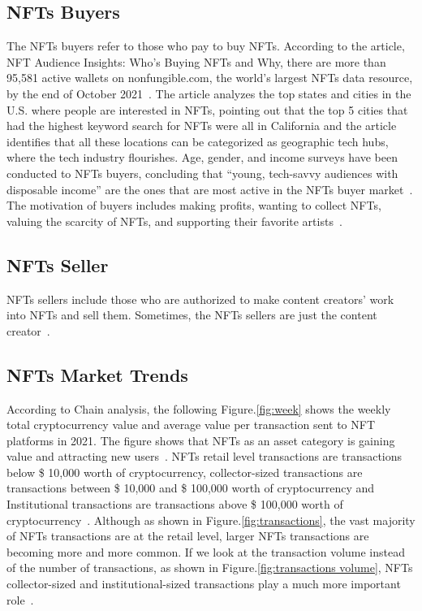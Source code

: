 \subsection{NFTs Buyers}
The NFTs buyers refer to those who pay to buy NFTs. According to the article, NFT Audience Insights: Who’s Buying NFTs and Why, there are more than 95,581 active wallets on nonfungible.com, the world’s largest NFTs data resource, by the end of October 2021~\cite{colormatics}. The article analyzes the top states and cities in the U.S. where people are interested in NFTs, pointing out that the top 5 cities that had the highest keyword search for NFTs were all in California and the article identifies that all these locations can be categorized as geographic tech hubs, where the tech industry flourishes. Age, gender, and income surveys have been conducted to NFTs buyers, concluding that “young, tech-savvy audiences with disposable income” are the ones that are most active in the NFTs buyer market~\cite{colormatics}. The motivation of buyers includes making profits, wanting to collect NFTs, valuing the scarcity of NFTs, and supporting their favorite artists~\cite{colormatics}. 

\subsection{NFTs Seller}
NFTs sellers include those who are authorized to make content creators’ work into NFTs and sell them. Sometimes, the NFTs sellers are just the content creator~\cite{das2022understanding}.


\subsection{NFTs Market Trends}
According to Chain analysis, the following Figure.\ref{fig:week} shows the weekly total cryptocurrency value and average value per transaction sent to NFT platforms in 2021. The figure shows that NFTs as an asset category is gaining value and attracting new users~\cite{tumblr_team_2022}. NFTs retail level transactions are transactions below \$ 10,000 worth of cryptocurrency, collector-sized transactions are transactions between \$ 10,000 and \$ 100,000 worth of cryptocurrency and Institutional transactions are transactions above \$ 100,000 worth of cryptocurrency~\cite{tumblr_team_2022}. Although as shown in Figure.\ref{fig:transactions}, the vast majority of NFTs transactions are at the retail level, larger NFTs transactions are becoming more and more common. If we look at the transaction volume instead of the number of transactions, as shown in Figure.\ref{fig:transactions volume}, NFTs collector-sized and institutional-sized transactions play a much more important role~\cite{tumblr_team_2022}.

